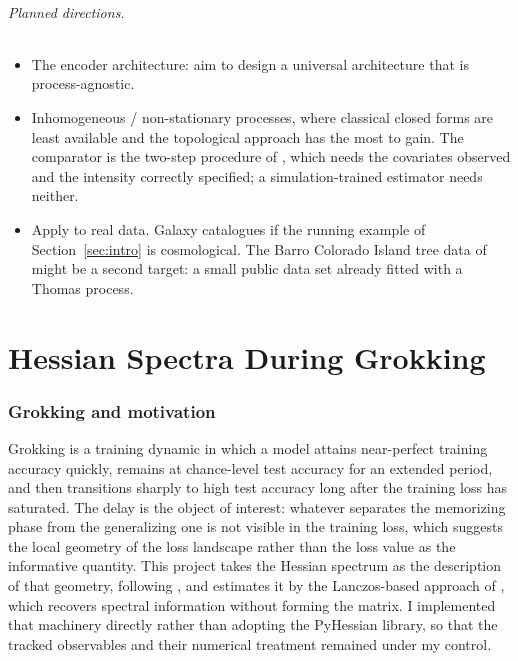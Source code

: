 \documentclass[11pt,a4paper]{article}
\begin{document}
\paragraph{Planned directions.}
\begin{itemize}[leftmargin=*,itemsep=2pt]
    \item The encoder architecture: aim to design a universal architecture that
    is process-agnostic.
    \item Inhomogeneous / non-stationary processes, where classical closed forms
    are least available and the topological approach has the most to gain. The
    comparator is the two-step procedure of \citet{waagepetersen2009twostep},
    which needs the covariates observed and the intensity correctly specified; a
    simulation-trained estimator needs neither.
    \item Apply to real data. Galaxy catalogues if the running example of
    Section~\ref{sec:intro} is cosmological. The Barro Colorado Island tree data
    of \citet{waagepetersen2009twostep} might be a second target: a small public
    data set already fitted with a Thomas process.
\end{itemize}

\part{Hessian Spectra During Grokking}

\section{Grokking and motivation}
\label{sec:hess-intro}

Grokking is a training dynamic in which a model attains near-perfect training
accuracy quickly, remains at chance-level test accuracy for an extended period,
and then transitions sharply to high test accuracy long after the training loss
has saturated. The delay is the object of interest: whatever separates the
memorizing phase from the generalizing one is not visible in the training loss,
which suggests the local geometry of the loss landscape rather than the loss
value as the informative quantity. This project takes the Hessian spectrum as
the description of that geometry, following \citet{fort2018goldilocks}, and
estimates it by the Lanczos-based approach of \citet{yao2020pyhessian}, which
recovers spectral information without forming the matrix. I implemented that
machinery directly rather than adopting the PyHessian library, so that the
tracked observables and their numerical treatment remained under my control.
\end{document}
